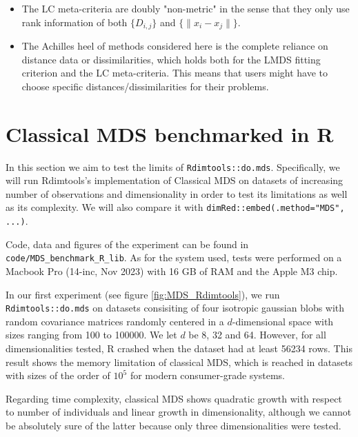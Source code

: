 \documentclass[a4paper,12pt]{article}
\begin{document}
\begin{itemize}
    \item The LC meta-criteria are doubly "non-metric" in the sense that they only use rank information of both $\{D_{i,j}\}$ and $\{\lVert x_i-x_j \rVert\}$.
    \item The Achilles heel of methods considered here is the complete reliance on distance data or dissimilarities, which holds both for the LMDS fitting criterion and the LC meta-criteria. This means that users might have to choose specific distances/dissimilarities for their problems.
    
\end{itemize}


\pagebreak
\section{Classical MDS benchmarked in R}

In this section we aim to test the limits of \texttt{Rdimtools::do.mds}. Specifically, we will run Rdimtools's implementation of Classical MDS on datasets of increasing number of observations and dimensionality in order to test its limitations as well as its complexity. We will also compare it with \texttt{dimRed::embed(.method="MDS", ...)}.

Code, data and figures of the experiment can be found in \verb$code/MDS_benchmark_R_lib$. As for the system used, tests were performed on a Macbook Pro (14-inc, Nov 2023) with 16 GB of RAM and the Apple M3 chip.

In our first experiment (see figure \ref{fig:MDS_Rdimtools}), we run \texttt{Rdimtools::do.mds} on datasets consisiting of four isotropic gaussian blobs with random covariance matrices randomly centered in a $d$-dimensional space with sizes ranging from 100 to 100000. We let $d$ be 8, 32 and 64. However, for all dimensionalities tested, R crashed when the dataset had at least 56234 rows. This result shows the memory limitation of classical MDS, which is reached in datasets with sizes of the order of $10^5$ for modern consumer-grade systems.

Regarding time complexity, classical MDS shows quadratic growth with respect to number of individuals and linear growth in dimensionality, although we cannot be absolutely sure of the latter because only three dimensionalities were tested.
\end{document}
